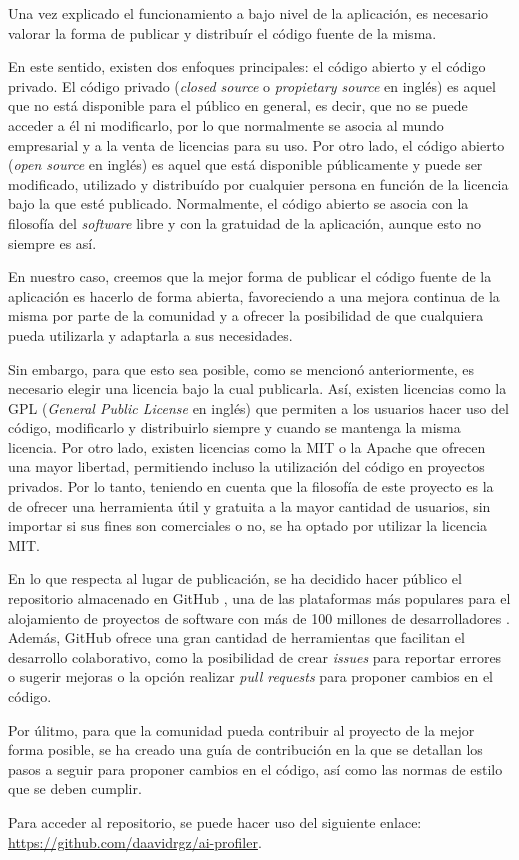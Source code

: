 {
	\color{blue}
	Una vez explicado el funcionamiento a bajo nivel de la aplicación, es necesario valorar la forma de publicar y
	distribuír el código fuente de la misma.

	\bigskip
	En este sentido, existen dos enfoques principales: el código abierto y el código privado.
	El código privado (\textit{closed source} o \textit{propietary source} en inglés) es aquel que no está disponible para el público en general, es decir, que no se puede acceder a él ni
	modificarlo, por lo que normalmente se asocia al mundo empresarial y a la venta de licencias para su uso.
	Por otro lado, el código abierto (\textit{open source} en inglés) es aquel que
	está disponible públicamente y puede ser modificado, utilizado y distribuído por cualquier persona en función
	de la licencia bajo la que esté publicado. Normalmente, el código abierto se asocia con la filosofía del \textit{software} libre
	y con la gratuidad de la aplicación, aunque esto no siempre es así.

	\bigskip
	En nuestro caso, creemos que la mejor forma de publicar el código fuente de la aplicación es hacerlo de forma abierta,
	favoreciendo a una mejora continua de la misma por parte de la comunidad y a ofrecer la posibilidad de que cualquiera pueda
	utilizarla y adaptarla a sus necesidades.

	\bigskip
	Sin embargo, para que esto sea posible, como se mencionó anteriormente, es necesario elegir una licencia bajo la cual publicarla. Así, existen licencias
	como la GPL (\textit{General Public License} en inglés) \cite{gpl} que permiten a los usuarios hacer uso del código, modificarlo y distribuirlo
	siempre y cuando se mantenga la misma licencia. Por otro lado, existen licencias como la MIT \cite{mitlicense} o la Apache \cite{apachelicense} que ofrecen una mayor libertad,
	permitiendo incluso la utilización del código en proyectos privados. Por lo tanto, teniendo en cuenta que la filosofía de este proyecto es la de ofrecer una herramienta útil y gratuita a la mayor
	cantidad de usuarios, sin importar si sus fines son comerciales o no, se ha optado por utilizar la licencia MIT.

	\bigskip
	En lo que respecta al lugar de publicación, se ha decidido hacer público el repositorio almacenado en GitHub \cite{github}, una de las
	plataformas más populares para el alojamiento de proyectos de software con más de 100 millones de desarrolladores \cite{100milliongithub}.
	Además, GitHub ofrece una gran cantidad de herramientas que facilitan el desarrollo colaborativo, como la posibilidad de crear \textit{issues} para
	reportar errores o sugerir mejoras o la opción realizar \textit{pull requests} para proponer cambios en el código.

	\bigskip
	Por úlitmo, para que la comunidad pueda contribuir al proyecto de la mejor forma posible, se ha creado una guía de contribución
	en la que se detallan los pasos a seguir para proponer cambios en el código, así como las normas de estilo que se deben cumplir.

	\bigskip
	Para acceder al repositorio, se puede hacer uso del siguiente enlace: \url{https://github.com/daavidrgz/ai-profiler}.
}
